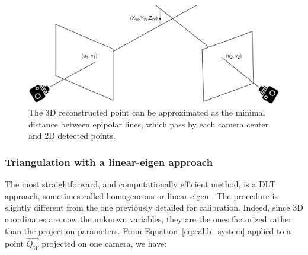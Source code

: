 \begin{figure}[hbtp]
	\centering
	\def\svgwidth{1\columnwidth}
	\fontsize{10pt}{10pt}\selectfont
	\includegraphics[width=0.7\linewidth]{"../Chap2/Figures/Triangulation.png"}
	\caption{The 3D reconstructed point can be approximated as the minimal distance between epipolar lines, which pass by each camera center and 2D detected points.}
	\label{fig_triangulation}
\end{figure}

\subsubsection{Triangulation with a linear-eigen approach}  

The most straightforward, and computationally efficient method, is a DLT approach, sometimes called homogeneous or linear-eigen \cite{Hartley1997}. The procedure is slightly different from the one previously detailed for calibration. Indeed, since 3D coordinates are now the unknown variables, they are the ones factorized rather than the projection parameters. From Equation~\ref{eq:calib_system} applied to a point $\overrightarrow{Q_W}$ projected on one camera, we have:

